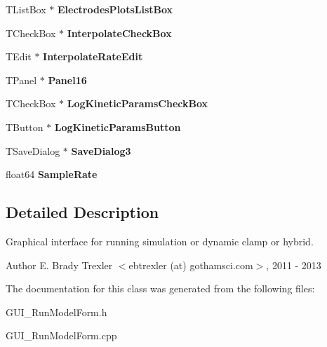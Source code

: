 \begin{DoxyCompactItemize}
\item 
\hypertarget{class_t_run_dynamic_clamp_form_a0d378ec48c93cc18ad4371541c18aae3}{T\+List\+Box $\ast$ {\bfseries Electrodes\+Plots\+List\+Box}}\label{class_t_run_dynamic_clamp_form_a0d378ec48c93cc18ad4371541c18aae3}

\item 
\hypertarget{class_t_run_dynamic_clamp_form_a14c7df42d5a6ed79697d3c5429e74916}{T\+Check\+Box $\ast$ {\bfseries Interpolate\+Check\+Box}}\label{class_t_run_dynamic_clamp_form_a14c7df42d5a6ed79697d3c5429e74916}

\item 
\hypertarget{class_t_run_dynamic_clamp_form_a199bc5aca25d8d4d8ab5fafb0f7788bb}{T\+Edit $\ast$ {\bfseries Interpolate\+Rate\+Edit}}\label{class_t_run_dynamic_clamp_form_a199bc5aca25d8d4d8ab5fafb0f7788bb}

\item 
\hypertarget{class_t_run_dynamic_clamp_form_aa3b39c8cdd536af71d39a76c6f4a6acf}{T\+Panel $\ast$ {\bfseries Panel16}}\label{class_t_run_dynamic_clamp_form_aa3b39c8cdd536af71d39a76c6f4a6acf}

\item 
\hypertarget{class_t_run_dynamic_clamp_form_a2f9d8b82929df2bba53d51c55cd41071}{T\+Check\+Box $\ast$ {\bfseries Log\+Kinetic\+Params\+Check\+Box}}\label{class_t_run_dynamic_clamp_form_a2f9d8b82929df2bba53d51c55cd41071}

\item 
\hypertarget{class_t_run_dynamic_clamp_form_a4b3127c23548492b016b74915537d358}{T\+Button $\ast$ {\bfseries Log\+Kinetic\+Params\+Button}}\label{class_t_run_dynamic_clamp_form_a4b3127c23548492b016b74915537d358}

\item 
\hypertarget{class_t_run_dynamic_clamp_form_a40bbdbef7b86075bf6a06d1d52d541c9}{T\+Save\+Dialog $\ast$ {\bfseries Save\+Dialog3}}\label{class_t_run_dynamic_clamp_form_a40bbdbef7b86075bf6a06d1d52d541c9}

\item 
\hypertarget{class_t_run_dynamic_clamp_form_ad072a2199909407205b92e8575af57b8}{float64 {\bfseries Sample\+Rate}}\label{class_t_run_dynamic_clamp_form_ad072a2199909407205b92e8575af57b8}

\end{DoxyCompactItemize}


\subsection{Detailed Description}
Graphical interface for running simulation or dynamic clamp or hybrid. 

\begin{DoxyAuthor}{Author}
E. Brady Trexler $<$ebtrexler (at) gothamsci.\+com$>$, 2011 -\/ 2013 
\end{DoxyAuthor}


The documentation for this class was generated from the following files\+:\begin{DoxyCompactItemize}
\item 
G\+U\+I\+\_\+\+Run\+Model\+Form.\+h\item 
G\+U\+I\+\_\+\+Run\+Model\+Form.\+cpp\end{DoxyCompactItemize}
